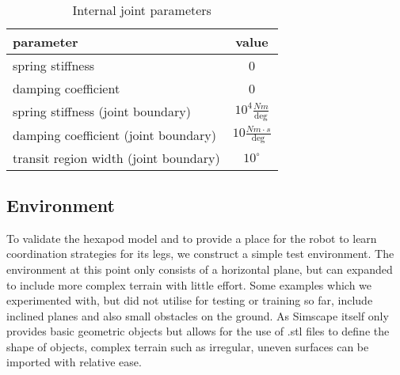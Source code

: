 \begin{comment}
The  thorax is represented by a rigid body and a main coordinate frame.
Each of the robots legs consists of 3 rigid bodies(coxa, femur and tibia) which are connected to each other by 2 joints.
A third joint then attaches the coxa and the leg as a whole to the main body.
Like the leg of an insect, the movement plane of the joint connecting coxa and thorax is parallel to the ground and orthogonal towards the other two joints.
Each of the joints used has 1 (rotational) DoF.
To position each rigid body and joint correctly, rigid transformations are used to translate and rotate each component.

As mentioned above, joints can receive as input a torque to be applied and can output sensory data, such as the joints position, velocity and acceleration. 
\end{comment}


\begin{table}
	\centering
	\begin{tabular}{| l | c |}
		\hline
		\textbf{parameter} & \textbf{value} \\
		\hline
		spring stiffness & 0 \\
		\hline
		damping coefficient & 0 \\
		\hline
		spring stiffness (joint boundary) & $10^4 \frac{Nm}{\text{deg}}$ \\
		\hline
		damping coefficient (joint boundary) &  $10 \frac{Nm \cdot s}{\text{deg}}$\\
		\hline
		transit region width (joint boundary) &  $10^{\circ}$\\
		\hline
	\end{tabular}
	\caption{Internal joint parameters}
	\label{table: Joint parameters}
\end{table}




\subsection{Environment}
To validate the hexapod model and to provide a place for the robot to learn coordination strategies for its legs, we construct a simple test environment.
The environment at this point only consists of a horizontal plane, but can expanded to include more complex terrain with little effort.
Some examples which we experimented with, but did not utilise for testing or training so far, include inclined planes and also small obstacles on the ground.
As Simscape itself only provides basic geometric objects but allows for the use of .stl files to define the shape of objects, complex terrain such as irregular, uneven surfaces can be imported with relative ease.

